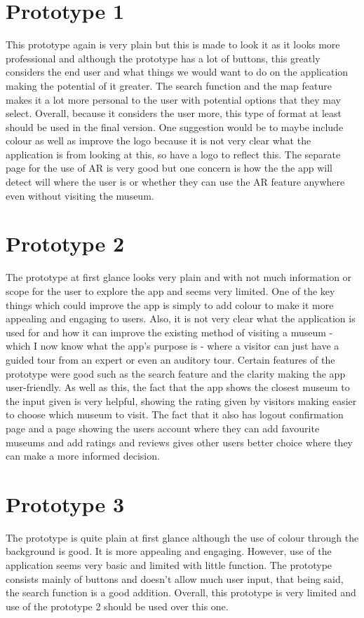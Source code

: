 \section*{Prototype 1}
This prototype again is very plain but this is made to look it as it looks more professional and although the prototype has a lot of buttons, this greatly considers the end user and what things we would want to do on the application making the potential of it greater. The search function and the map feature makes it a lot more personal to the user with potential options that they may select. Overall, because it considers the user more, this type of format at least should be used in the final version. One suggestion would be to maybe include colour as well as improve the logo because it is not very clear what the application is from looking at this, so have a logo to reflect this. The separate page for the use of AR is very good but one concern is how the the app will detect will where the user is or whether they can use the AR feature anywhere even without visiting the museum.\\

\section*{Prototype 2}
The prototype at first glance looks very plain and with not much information or scope for the user to explore the app and seems very limited. One of the key things which could improve the app is simply to add colour to make it more appealing and engaging to users. Also, it is not very clear what the application is used for and how it can improve the existing method of visiting a museum - which I now know what the app’s purpose is - where a visitor can just have a guided tour from an expert or even an auditory tour. Certain features of the prototype were good such as the search feature and the clarity making the app user-friendly. As well as this, the fact that the app shows the closest museum to the input given is very helpful, showing the rating given by visitors making easier to choose which museum to visit. The fact that it also has logout confirmation page and a page showing the users account where they can add favourite museums and add ratings and reviews gives other users better choice where they can make a more informed decision.\\

\section*{Prototype 3}
The prototype is quite plain at first glance although the use of colour through the background is good. It is more appealing and engaging. However, use of the application seems very basic and limited with little function. The prototype consists mainly of buttons and doesn’t allow much user input, that being said, the search function is a good addition. Overall, this prototype is very limited and use of the prototype 2 should be used over this one.